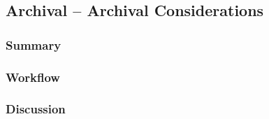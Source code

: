 \subsection{Archival -- Archival Considerations} \label{subsec:tv-archival}

	\subsubsection{Summary}
	
	\lipsum[1] %
	
	\subsubsection{Workflow}
	
	\lipsum[1] %
	
	\subsubsection{Discussion}
	
	\lipsum[1] %